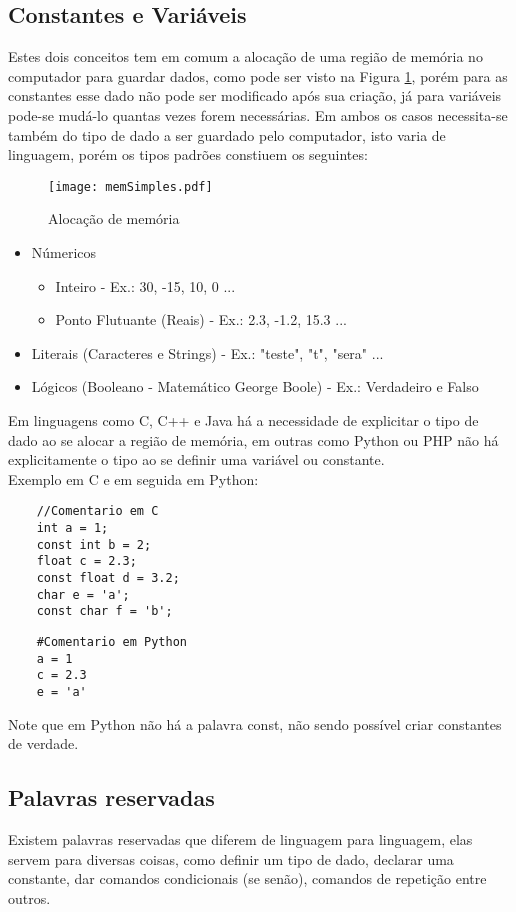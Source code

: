 \subsection{Constantes e Variáveis}
Estes dois conceitos tem em comum a alocação de uma região de memória no computador para guardar dados, como pode ser visto na Figura \ref{fig:memSimples}, porém para as constantes esse dado não pode ser modificado após sua criação, já para variáveis pode-se mudá-lo quantas vezes forem necessárias. Em ambos os casos necessita-se também do tipo de dado a ser guardado pelo computador, isto varia de linguagem, porém os tipos padrões constiuem os seguintes:
\begin{figure}[!h]
    \centering
    \texttt{[image: memSimples.pdf]}
    \caption{Alocação de memória}
    \label{fig:memSimples}
\end{figure}
\begin{itemize}
    \item Númericos
    \begin{itemize}
        \item Inteiro - Ex.: 30, -15, 10, 0 ...
        \item Ponto Flutuante (Reais) - Ex.: 2.3, -1.2, 15.3 ...
    \end{itemize}
    \item Literais (Caracteres e Strings) - Ex.: "teste", "t", "sera" ...
    \item Lógicos (Booleano - Matemático George Boole) - Ex.: Verdadeiro e Falso
\end{itemize}
Em linguagens como C, C++ e Java há a necessidade de explicitar o tipo de dado ao se alocar a região de memória, em outras como Python ou PHP não há explicitamente o tipo ao se definir uma variável ou constante. \\
Exemplo em C e em seguida em Python:
\begin{lstlisting}
    //Comentario em C
    int a = 1;
    const int b = 2;
    float c = 2.3;
    const float d = 3.2;
    char e = 'a';
    const char f = 'b';
\end{lstlisting}
\begin{lstlisting}
    #Comentario em Python
    a = 1
    c = 2.3
    e = 'a'
\end{lstlisting}
Note que em Python não há a palavra const, não sendo possível criar constantes de verdade.
\subsection{Palavras reservadas}
Existem palavras reservadas que diferem de linguagem para linguagem, elas servem para diversas coisas, como definir um tipo de dado, declarar uma constante, dar comandos condicionais (se senão), comandos de repetição entre outros.
